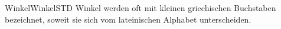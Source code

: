 \begin{MXContent}{Winkel}{Winkel}{STD}
Winkel werden oft mit kleinen griechischen Buchstaben bezeichnet, soweit sie
sich vom lateinischen Alphabet unterscheiden. 
% 





\end{MXContent}
